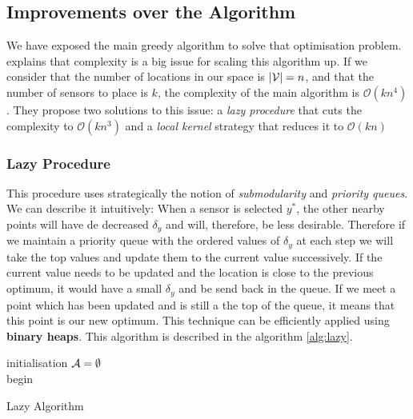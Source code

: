 \subsection{Improvements over the Algorithm}



We have exposed the main greedy algorithm to solve that optimisation problem. \citet{krause_near-optimal_2008} explains that complexity is a big issue for scaling this algorithm up. If we consider that the number of locations in our space is $|\mathcal{V}| = n$, and that the number of sensors to place is $k$, the complexity of the main algorithm is $\mathcal{O}(kn^4)$. They propose two solutions to this issue: a \textit{lazy procedure} that cuts the complexity to  $\mathcal{O}(kn^3)$ and a \textit{local kernel} strategy that reduces it to $\mathcal{O}(kn)$

\subsubsection{Lazy Procedure} This procedure uses strategically the notion of \textit{submodularity} and \textit{priority queues}. We can describe it intuitively: When a sensor is selected $y^*$, the other nearby points will have de decreased $\delta_y$ and will, therefore, be less desirable. Therefore if we maintain a priority queue with the ordered values of $\delta_y$ at each step we will take the top values and update them to the current value successively. If the current value needs to be updated and the location is close to the previous optimum, it would have a small $\delta_y$ and be send back in the queue. If we meet a point which has been updated and is still a the top of the queue, it means that this point is our new optimum. This technique can be efficiently applied using \textbf{binary heaps}. This algorithm is described in the algorithm \ref{alg:lazy}. \\ 


\begin{algorithm}[h]
 initialisation\;
 $\mathcal{A} = \emptyset$ \\
 begin\;
\caption{Lazy Algorithm}
\label{alg:lazy}
\end{algorithm}

